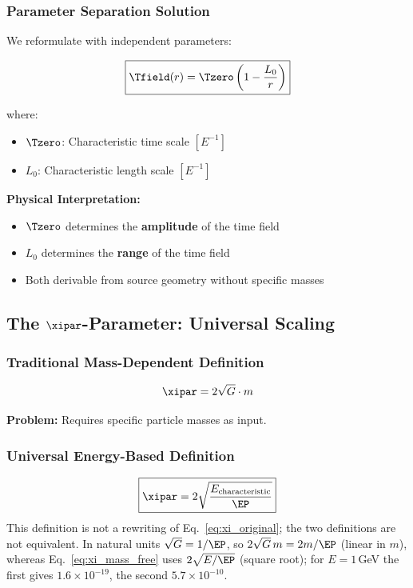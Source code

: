 	\subsubsection{Parameter Separation Solution}
	
	We reformulate with independent parameters:
	
	\begin{equation}
		\boxed{\Tfield(r) = \Tzero\left(1 - \frac{L_0}{r}\right)}
		\label{eq:point_source_mass_free}
	\end{equation}
	
	where:
	\begin{itemize}
		\item $\Tzero$: Characteristic time scale $[E^{-1}]$
		\item $L_0$: Characteristic length scale $[E^{-1}]$
	\end{itemize}
	
	\textbf{Physical Interpretation:}
	\begin{itemize}
		\item $\Tzero$ determines the \textbf{amplitude} of the time field
		\item $L_0$ determines the \textbf{range} of the time field
		\item Both derivable from source geometry without specific masses
	\end{itemize}
	
	\subsection{The $\xipar$-Parameter: Universal Scaling}
	\label{subsec:xi_elimination}
	
	\subsubsection{Traditional Mass-Dependent Definition}
	
	\begin{equation}
		\xipar = 2\sqrt{G} \cdot m
		\label{eq:xi_original}
	\end{equation}
	
	\textbf{Problem:} Requires specific particle masses as input.
	
	\subsubsection{Universal Energy-Based Definition}
	
	\begin{equation}
		\boxed{\xipar = 2\sqrt{\frac{E_{\text{characteristic}}}{\EP}}}
		\label{eq:xi_mass_free}
	\end{equation}
	This definition is not a rewriting of Eq.~\eqref{eq:xi_original}; the two definitions are not equivalent. In natural units $\sqrt{G}=1/\EP$, so $2\sqrt{G}\,m=2m/\EP$ (linear in $m$), whereas Eq.~\eqref{eq:xi_mass_free} uses $2\sqrt{E/\EP}$ (square root); for $E=1$\,GeV the first gives $1.6\times10^{-19}$, the second $5.7\times10^{-10}$.
	
